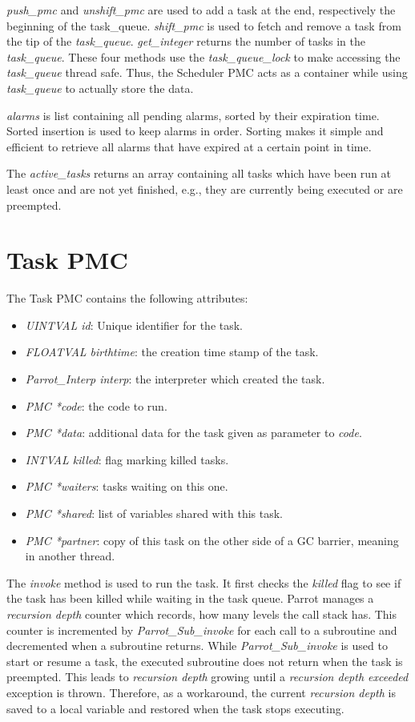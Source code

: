 \documentclass[bachelor,english]{hgbthesis}
\begin{document}
\textit{push\_pmc} and \textit{unshift\_pmc} are used to add a task at the end, respectively the beginning of the task\_queue. \textit{shift\_pmc} is used to fetch and remove a task from the tip of the \textit{task\_queue}. \textit{get\_integer} returns the number of tasks in the \textit{task\_queue}. These four methods use the \textit{task\_queue\_lock} to make accessing the \textit{task\_queue} thread safe. Thus, the Scheduler PMC acts as a container while using \textit{task\_queue} to actually store the data.

\textit{alarms} is list containing all pending alarms, sorted by their expiration time. Sorted insertion is used to keep alarms in order. Sorting makes it simple and efficient to retrieve all alarms that have expired at a certain point in time.

The \textit{active\_tasks} returns an array containing all tasks which have been run at least once and are not yet finished, e.g., they are currently being executed or are preempted.

\section{Task PMC}

The Task PMC contains the following attributes:
%
\begin{itemize}
\item \textit{UINTVAL id}: Unique identifier for the task.
\item \textit{FLOATVAL birthtime}: the creation time stamp of the task.
\item \textit{Parrot\_Interp interp}: the interpreter which created the task.
\item \textit{PMC *code}: the code to run.
\item \textit{PMC *data}: additional data for the task given as parameter to \textit{code}.
\item \textit{INTVAL killed}: flag marking killed tasks.
\item \textit{PMC *waiters}: tasks waiting on this one.
\item \textit{PMC *shared}: list of variables shared with this task.
\item \textit{PMC *partner}: copy of this task on the other side of a GC barrier, meaning in another thread.
\end{itemize}

The \textit{invoke} method is used to run the task. It first checks the \textit{killed} flag to see if the task has been killed while waiting in the task queue. Parrot manages a \textit{recursion depth} counter which records, how many levels the call stack has. This counter is incremented by \textit{Parrot\_Sub\_invoke} for each call to a subroutine and decremented when a subroutine returns. While \textit{Parrot\_Sub\_invoke} is used to start or resume a task, the executed subroutine does not return when the task is preempted. This leads to \textit{recursion depth} growing until a \textit{recursion depth exceeded} exception is thrown. Therefore, as a workaround, the current \textit{recursion depth} is saved to a local variable and restored when the task stops executing.
\end{document}
